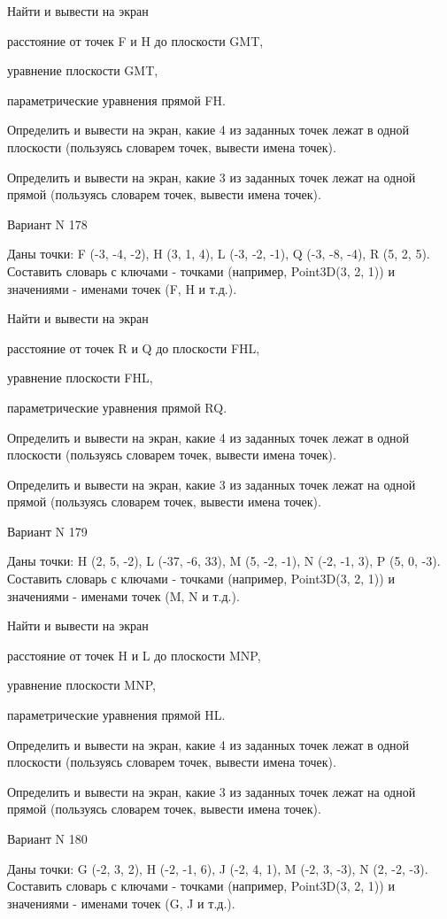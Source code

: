 \documentclass[11pt]{report}
\begin{document}
Найти и вывести на экран


расстояние от точек F и H до плоскости GMT,


уравнение плоскости GMT,


параметрические уравнения прямой FH.


Определить и вывести на экран, какие 4 из заданных точек лежат в одной плоскости (пользуясь словарем точек, вывести имена точек).


Определить и вывести на экран, какие 3 из заданных точек лежат на одной прямой (пользуясь словарем точек, вывести имена точек).

\newpage
Вариант N 178

Даны точки: F (-3, -4, -2), H (3, 1, 4), L (-3, -2, -1), Q (-3, -8, -4), R (5, 2, 5).
Составить словарь с ключами - точками (например, Point3D(3, 2, 1)) и значениями - именами точек (F, H и т.д.).


Найти и вывести на экран


расстояние от точек R и Q до плоскости FHL,


уравнение плоскости FHL,


параметрические уравнения прямой RQ.


Определить и вывести на экран, какие 4 из заданных точек лежат в одной плоскости (пользуясь словарем точек, вывести имена точек).


Определить и вывести на экран, какие 3 из заданных точек лежат на одной прямой (пользуясь словарем точек, вывести имена точек).

\newpage
Вариант N 179

Даны точки: H (2, 5, -2), L (-37, -6, 33), M (5, -2, -1), N (-2, -1, 3), P (5, 0, -3).
Составить словарь с ключами - точками (например, Point3D(3, 2, 1)) и значениями - именами точек (M, N и т.д.).


Найти и вывести на экран


расстояние от точек H и L до плоскости MNP,


уравнение плоскости MNP,


параметрические уравнения прямой HL.


Определить и вывести на экран, какие 4 из заданных точек лежат в одной плоскости (пользуясь словарем точек, вывести имена точек).


Определить и вывести на экран, какие 3 из заданных точек лежат на одной прямой (пользуясь словарем точек, вывести имена точек).

\newpage
Вариант N 180

Даны точки: G (-2, 3, 2), H (-2, -1, 6), J (-2, 4, 1), M (-2, 3, -3), N (2, -2, -3).
Составить словарь с ключами - точками (например, Point3D(3, 2, 1)) и значениями - именами точек (G, J и т.д.).
\end{document}
